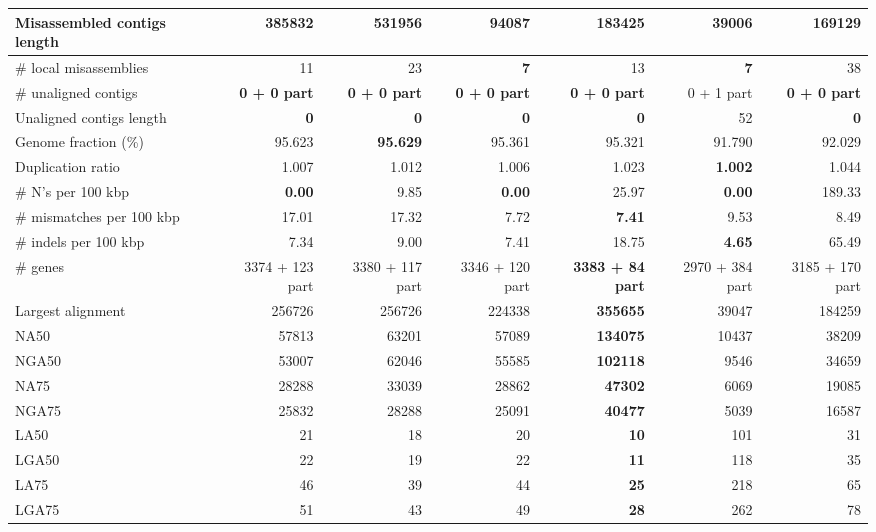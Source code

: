 \documentclass[12pt,a4paper]{article}
\begin{document}
\begin{table}[ht]
\begin{center}
\begin{tabular}{|l*{6}{|r}|}
Misassembled contigs length & 385832 & 531956 & 94087 & 183425 & {\bf 39006} & 169129 \\ \hline
\# local misassemblies & 11 & 23 & {\bf 7} & 13 & {\bf 7} & 38 \\ \hline
\# unaligned contigs & {\bf 0 + 0 part} & {\bf 0 + 0 part} & {\bf 0 + 0 part} & {\bf 0 + 0 part} & 0 + 1 part & {\bf 0 + 0 part} \\ \hline
Unaligned contigs length & {\bf 0} & {\bf 0} & {\bf 0} & {\bf 0} & 52 & {\bf 0} \\ \hline
Genome fraction (\%) & 95.623 & {\bf 95.629} & 95.361 & 95.321 & 91.790 & 92.029 \\ \hline
Duplication ratio & 1.007 & 1.012 & 1.006 & 1.023 & {\bf 1.002} & 1.044 \\ \hline
\# N's per 100 kbp & {\bf 0.00} & 9.85 & {\bf 0.00} & 25.97 & {\bf 0.00} & 189.33 \\ \hline
\# mismatches per 100 kbp & 17.01 & 17.32 & 7.72 & {\bf 7.41} & 9.53 & 8.49 \\ \hline
\# indels per 100 kbp & 7.34 & 9.00 & 7.41 & 18.75 & {\bf 4.65} & 65.49 \\ \hline
\# genes & 3374 + 123 part & 3380 + 117 part & 3346 + 120 part & {\bf 3383 + 84 part} & 2970 + 384 part & 3185 + 170 part \\ \hline
Largest alignment & 256726 & 256726 & 224338 & {\bf 355655} & 39047 & 184259 \\ \hline
NA50 & 57813 & 63201 & 57089 & {\bf 134075} & 10437 & 38209 \\ \hline
NGA50 & 53007 & 62046 & 55585 & {\bf 102118} & 9546 & 34659 \\ \hline
NA75 & 28288 & 33039 & 28862 & {\bf 47302} & 6069 & 19085 \\ \hline
NGA75 & 25832 & 28288 & 25091 & {\bf 40477} & 5039 & 16587 \\ \hline
LA50 & 21 & 18 & 20 & {\bf 10} & 101 & 31 \\ \hline
LGA50 & 22 & 19 & 22 & {\bf 11} & 118 & 35 \\ \hline
LA75 & 46 & 39 & 44 & {\bf 25} & 218 & 65 \\ \hline
LGA75 & 51 & 43 & 49 & {\bf 28} & 262 & 78 \\ \hline
\end{tabular}
\end{center}
\end{table}
\end{document}

